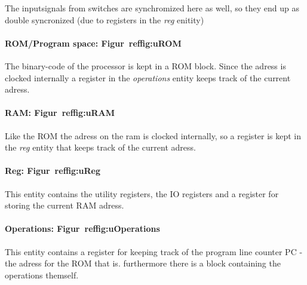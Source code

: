 The inputsignals from switches are synchromized here as well, so they end up as
double syncronized (due to registers in the \emph{reg} enitity)

\paragraph{ROM/Program space: Figur~ref{fig:uROM}}
The binary-code of the processor is kept in a ROM block. Since the adress is
clocked internally a register in the \emph{operations} entity keeps track of the
current adress.

\paragraph{RAM: Figur~ref{fig:uRAM}}
Like the ROM the adress on the ram is clocked internally, so a register is kept
in the \emph{reg} entity that keeps track of the current adress.

\paragraph{Reg: Figur~ref{fig:uReg}}
This entity contains the utility registers, the IO registers and a register for
storing the current RAM adress.

\paragraph{Operations: Figur~ref{fig:uOperations}}
This entity contains a register for keeping track of the program line counter
PC - the adress for the ROM that is. furthermore there is a block containing the
operations themself.



